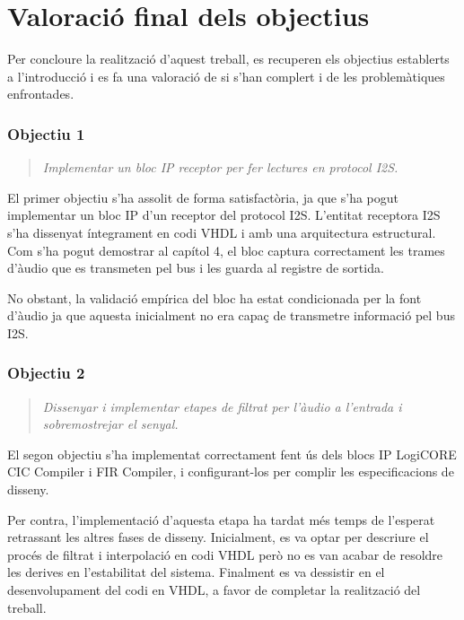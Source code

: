 \section{Valoració final dels objectius}
Per concloure la realització d'aquest treball, es recuperen els objectius establerts a l'introducció i es fa una valoració de si s'han complert i de les problemàtiques enfrontades.  

\subsubsection{Objectiu 1}
\begin{quote}
    \textit{Implementar un bloc IP receptor per fer lectures en protocol I2S.}
\end{quote}
\par El primer objectiu s'ha assolit de forma satisfactòria, ja que s'ha pogut implementar un bloc IP d'un receptor del protocol I2S. L'entitat receptora I2S s'ha dissenyat íntegrament en codi VHDL i amb una arquitectura estructural. Com s'ha pogut demostrar al capítol 4, el bloc captura correctament les trames d'àudio que es transmeten pel bus i les guarda al registre de sortida. 
\par No obstant, la validació empírica del bloc ha estat condicionada per la font d'àudio ja que aquesta inicialment no era capaç de transmetre informació pel bus I2S.   

\subsubsection{Objectiu 2}
\begin{quote}
    \textit{Dissenyar i implementar etapes de filtrat per l'àudio a l'entrada i sobremostrejar el senyal.}
\end{quote}
\par El segon objectiu s'ha implementat correctament fent ús dels blocs IP LogiCORE CIC Compiler i FIR Compiler, i configurant-los per complir les especificacions de disseny. 
\par Per contra, l'implementació d'aquesta etapa ha tardat més temps de l'esperat retrassant les altres fases de disseny. Inicialment, es va optar per descriure el procés de filtrat i interpolació en codi VHDL però no es van acabar de resoldre les derives en l'estabilitat del sistema. Finalment es va dessistir en el desenvolupament del codi en VHDL, a favor de completar la realització del treball. 

